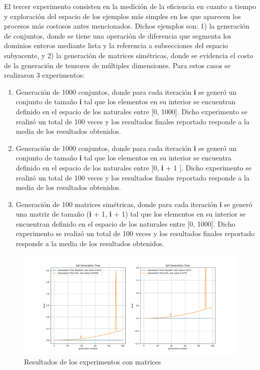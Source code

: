 El tercer experimento consisten en la medición de la eficiencia en cuanto a tiempo y exploración
del espacio de los ejemplos más simples en los que aparecen los procesos más costosos antes
mencionados. Dichos ejemplos son: 1) la generación de conjuntos, donde se tiene una operación de
diferencia que segmenta los dominios enteros mediante lista y la referencia a subsecciones del
espacio subyacente, y 2) la generación de matrices simétricas, donde se evidencia el costo de
la generación de tensores de múltiples dimensiones. Para estos casos se realizaron 3 experimentos:
\begin{enumerate}
      \item Generación de 1000 conjuntos, donde para cada iteración {\bf i} se generó un conjunto de tamaño {\bf i}
            tal que los elementos en su interior se encuentran definido en el espacio de los naturales entre
                  [0, 1000]. Dicho experimento se realizó un total de 100 veces y los resultados finales reportado
            responde a la media de los resultados obtenidos.
      \item Generación de 1000 conjuntos, donde para cada iteración {\bf i} se generó un conjunto de tamaño {\bf i}
            tal que los elementos en su interior se encuentra definido en el espacio de los naturales entre
                  [0, {\bf i} + 1 ]. Dicho experimento se realizó un total de 100 veces y los resultados finales reportado
            responde a la media de los resultados obtenidos.
      \item Generación de 100 matrices simétricas, donde para cada iteración {\bf i} se generó una matriz de
            tamaño ({\bf i} + 1, {\bf i} + 1) tal que los elementos en su interior se encuentran definido en el espacio de los
            naturales entre [0, 1000]. Dicho experimento se realizó un total de 100 veces y los resultados
            finales reportado responde a la media de los resultados obtenidos.
\end{enumerate}


\begin{figure}[!ht]
      \includegraphics[width=\linewidth]{Graphics/exp4.png}
      \caption{Resultados de los experimentos con matrices}
      \label{fig:exp_4}
\end{figure}

